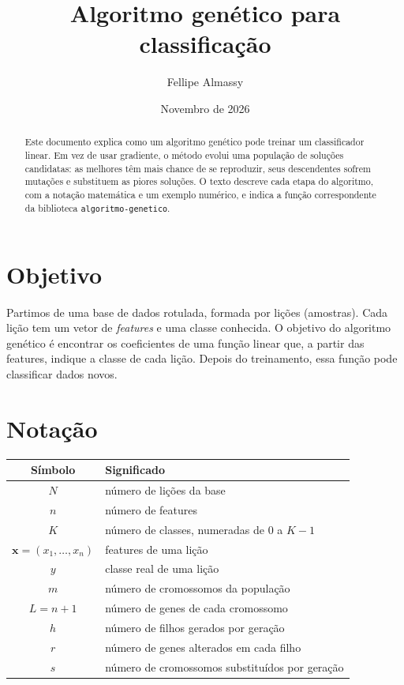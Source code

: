 \documentclass[11pt,a4paper]{article}
\title{Algoritmo genético para classificação}
\author{Fellipe Almassy}
\date{Novembro de 2026}
\newcommand{\cod}[1]{\texttt{#1}}
\begin{document}
\maketitle

\begin{abstract}
Este documento explica como um algoritmo genético pode treinar um classificador
linear. Em vez de usar gradiente, o método evolui uma população de soluções
candidatas: as melhores têm mais chance de se reproduzir, seus descendentes sofrem
mutações e substituem as piores soluções. O texto descreve cada etapa do algoritmo,
com a notação matemática e um exemplo numérico, e indica a função correspondente da
biblioteca \cod{algoritmo-genetico}.
\end{abstract}

\section{Objetivo}

Partimos de uma base de dados rotulada, formada por lições (amostras). Cada lição tem
um vetor de \emph{features} e uma classe conhecida. O objetivo do algoritmo genético é
encontrar os coeficientes de uma função linear que, a partir das features, indique a
classe de cada lição. Depois do treinamento, essa função pode classificar dados novos.

\section{Notação}

\begin{center}
\begin{tabular}{cl}
\toprule
Símbolo & Significado \\
\midrule
$N$ & número de lições da base \\
$n$ & número de features \\
$K$ & número de classes, numeradas de $0$ a $K-1$ \\
$\mathbf{x} = (x_1, \dots, x_n)$ & features de uma lição \\
$y$ & classe real de uma lição \\
$m$ & número de cromossomos da população \\
$L = n + 1$ & número de genes de cada cromossomo \\
$h$ & número de filhos gerados por geração \\
$r$ & número de genes alterados em cada filho \\
$s$ & número de cromossomos substituídos por geração \\
\bottomrule
\end{tabular}
\end{center}
\end{document}
